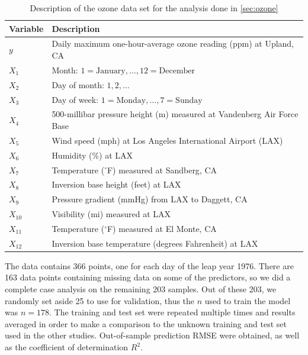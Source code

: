 \documentclass[showframe,11pt,twoside,openright]{report}
\begin{document}
\begin{table}[htbp]
\centering
\caption{Description of the ozone data set for the analysis done in \cref{sec:ozone}}
\label{tab:ozone}
\begin{tabular}{ll}
\toprule
Variable     & Description \\
\midrule
$y$      & Daily maximum one-hour-average ozone reading (ppm) at Upland, CA \\
$X_1$    & Month: $1 = \text{January}, \dots, 12 = \text{December}$\\
$X_2$    & Day of month: $1,2,\dots$ \\
$X_3$    & Day of week: $1 = \text{Monday}, \dots, 7 = \text{Sunday}$ \\
$X_4$    & 500-millibar pressure height (m) measured at Vandenberg Air Force Base \\
$X_5$    & Wind speed (mph) at Los Angeles International Airport (LAX) \\
$X_6$    & Humidity (\%) at LAX \\
$X_7$    & Temperature ($^\circ$F) measured at Sandberg, CA \\
$X_8$    & Inversion base height (feet) at LAX \\
$X_9$    & Pressure gradient (mmHg) from LAX to Daggett, CA \\
$X_{10}$ & Visibility (mi) measured at LAX \\
$X_{11}$ & Temperature ($^\circ$F) measured at El Monte, CA \\      
$X_{12}$ & Inversion base temperature (degrees Fahrenheit) at LAX \\             
\end{tabular}

\end{table}

The data contains 366 points, one for each day of the leap year 1976. 
There are 163 data points containing missing data on some of the predictors, so we did a complete case analysis on the remaining 203 samples. 
Out of these 203, we randomly set aside 25 to use for validation, thus the $n$ used to train the model was $n=178$. 
The training and test set were repeated multiple times and results averaged in order to make a comparison to the unknown training and test set used in the other studies.
Out-of-sample prediction RMSE were obtained, as well as the coefficient of determination $R^2$.
\end{document}
